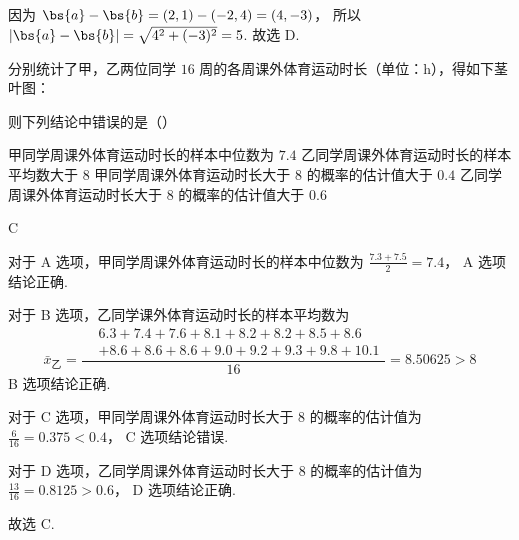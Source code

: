 \begin{solution}
因为
\(\bs{a}-\bs{b}=(2,1)-(-2,4)=(4,-3)\)，
所以
\(\left|\bs{a}-\bs{b}\right|=\sqrt{4^2+(-3)^2}=5\).
故选 D.
\end{solution}

\begin{problem}
分别统计了甲，乙两位同学 \(16\) 周的各周课外体育运动时长（单位：h），得如下茎叶图：



则下列结论中错误的是（\quad）

\choices
    {甲同学周课外体育运动时长的样本中位数为 \(7.4\)}
    {乙同学周课外体育运动时长的样本平均数大于 \(8\)}
    {甲同学周课外体育运动时长大于 \(8\) 的概率的估计值大于 \(0.4\)}
    {乙同学周课外体育运动时长大于 \(8\) 的概率的估计值大于 \(0.6\)}
\end{problem}

\begin{answer}
C
\end{answer}

\begin{solution}
对于 A 选项，甲同学周课外体育运动时长的样本中位数为
\(\frac{7.3+7.5}{2}=7.4\)，
A 选项结论正确.

对于 B 选项，乙同学课外体育运动时长的样本平均数为
\[
\bar{x}_{\text{乙}}
=\frac{\begin{aligned}
&6.3+7.4+7.6+8.1+8.2+8.2+8.5+8.6\\
&+8.6+8.6+8.6+9.0+9.2+9.3+9.8+10.1
\end{aligned}}{16}
=8.50625>8
\]
B 选项结论正确.

对于 C 选项，甲同学周课外体育运动时长大于 \(8\) 的概率的估计值为
\(\frac{6}{16}=0.375<0.4\)，
C 选项结论错误.

对于 D 选项，乙同学周课外体育运动时长大于 \(8\) 的概率的估计值为
\(\frac{13}{16}=0.8125>0.6\)，
D 选项结论正确.

故选 C.
\end{solution}

